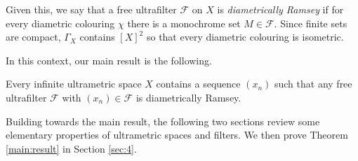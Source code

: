 Given this, we say that a free ultrafilter \( \mathcal{F} \) on \( X \) is \emph{diametrically Ramsey} if for every diametric colouring \( \chi \) there is a monochrome set \( M \in \mathcal{F} \). Since finite sets are compact, \( \Gamma_{X} \) contains \( [X]^{2} \) so that every diametric colouring is isometric.

In this context, our main result is the following.
\begin{theorem}
\label{main:result}
Every infinite ultrametric space \( X \) contains a sequence \((x_{n})\) such that any free ultrafilter \( \mathcal{F} \) with \( (x_{n}) \in \mathcal{F} \) is diametrically Ramsey.
\end{theorem}

Building towards the main result, the following two sections review some elementary properties of ultrametric spaces and filters. We then prove Theorem \ref{main:result} in Section \ref{sec:4}.
